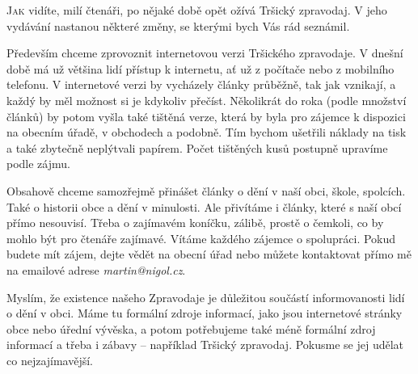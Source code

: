 \documentclass[11pt]{article}
\begin{document}
\begin{multicols}{3}{


\lettrine{J}{ak} vidíte, milí čtenáři, po nějaké době opět ožívá Tršický zpravodaj. V jeho vydávání nastanou některé změny, se kterými bych Vás rád seznámil.

Především chceme zprovoznit internetovou verzi Tršického zpravodaje. V dnešní době má už většina lidí přístup k internetu, ať už z počítače nebo z mobilního telefonu. V internetové verzi by vycházely články průběžně, tak jak vznikají, a každý by měl možnost si je kdykoliv přečíst. Několikrát do roka (podle množství článků) by potom vyšla také tištěná verze, která by byla pro zájemce k dispozici na obecním úřadě, v obchodech a podobně. Tím bychom ušetřili náklady na tisk a také zbytečně neplýtvali papírem. Počet tištěných kusů postupně upravíme podle zájmu.

Obsahově chceme samozřejmě přinášet články o dění v naší obci, škole, spolcích. Také o historii obce a dění v minulosti. Ale přivítáme i články, které s naší obcí přímo nesouvisí. Třeba o zajímavém koníčku, zálibě, prostě o čemkoli, co by mohlo být pro čtenáře zajímavé. Vítáme každého zájemce o spolupráci. Pokud budete mít zájem, dejte vědět na obecní úřad nebo můžete kontaktovat přímo mě na emailové adrese \emph{martin@nigol.cz}.

Myslím, že existence našeho Zpravodaje je důležitou součástí informovanosti lidí o dění v obci. Máme tu formální zdroje informací, jako jsou internetové stránky obce nebo úřední vývěska, a potom potřebujeme také méně formální zdroj informací a třeba i zábavy – například Tršický zpravodaj. Pokusme se jej udělat co nejzajímavější.

}\end{multicols}

\closearticle
\end{document}
